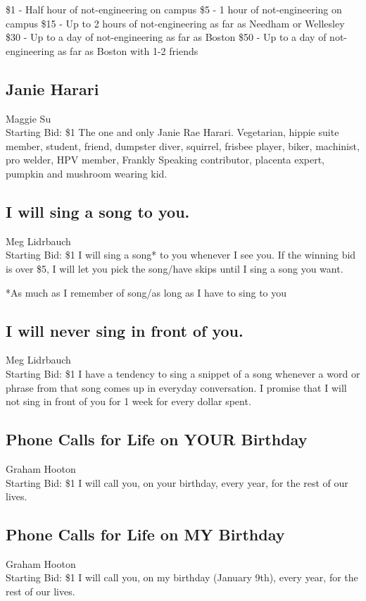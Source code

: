 \documentclass[11pt]{article}
\begin{document}
\$1 - Half hour of not-engineering on campus
\$5 - 1 hour of not-engineering on campus
\$15 - Up to 2 hours of not-engineering as far as Needham or Wellesley
\$30 - Up to a day of not-engineering as far as Boston 
\$50 - Up to a day of not-engineering as far as Boston with 1-2 friends
\subsection{Janie Harari}
Maggie Su
\\
Starting Bid: \$1
\newline
The one and only Janie Rae Harari. Vegetarian, hippie suite member, student, friend, dumpster diver, squirrel, frisbee player, biker, machinist, pro welder, HPV member, Frankly Speaking contributor, placenta expert, pumpkin and mushroom wearing kid.
\subsection{I will sing a song to you.}
Meg Lidrbauch
\\
Starting Bid: \$1
\newline
I will sing a song* to you whenever I see you. If the winning bid is over \$5, I will let you pick the song/have skips until I sing a song you want. 

*As much as I remember of song/as long as I have to sing to you
\subsection{I will never sing in front of you.}
Meg Lidrbauch
\\
Starting Bid: \$1
\newline
I have a tendency to sing a snippet of a song whenever a word or phrase from that song comes up in everyday conversation. I promise that I will not sing in front of you for 1 week for every dollar spent.
\subsection{Phone Calls for Life on YOUR Birthday}
Graham Hooton
\\
Starting Bid: \$1
\newline
I will call you, on your birthday, every year, for the rest of our lives.
\subsection{Phone Calls for Life on MY Birthday}
Graham Hooton
\\
Starting Bid: \$1
\newline
I will call you, on my birthday (January 9th), every year, for the rest of our lives.
\end{document}
